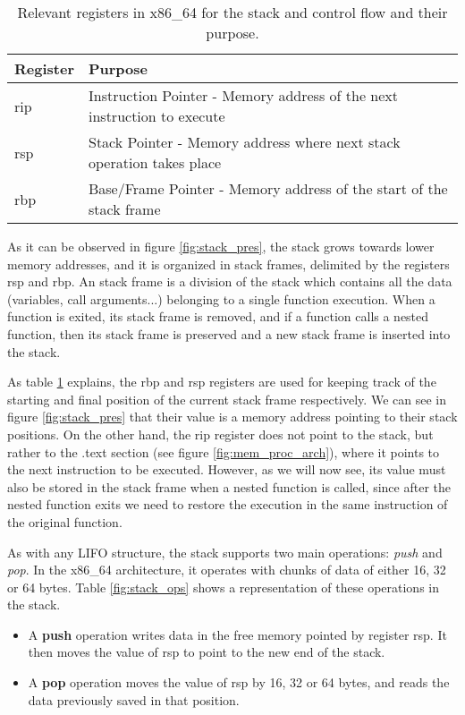 \begin{table}[htbp]
\begin{tabular}{|>{\centering\arraybackslash}p{2cm}|>{\centering\arraybackslash}p{10cm}|}
\hline
Register & Purpose\\
\hline
\hline
rip & Instruction Pointer - Memory address of the next instruction to execute\\
\hline
rsp & Stack Pointer - Memory address where next stack operation takes place\\
\hline
rbp & Base/Frame Pointer - Memory address of the start of the stack frame\\
\hline
\end{tabular}
\caption{Relevant registers in x86\_64 for the stack and control flow and their purpose.}
\label{table:systemv_abi_other}
\end{table}

As it can be observed in figure \ref{fig:stack_pres}, the stack grows towards lower memory addresses, and it is organized in stack frames, delimited by the registers rsp and rbp. An stack frame is a division of the stack which contains all the data (variables, call arguments...) belonging to a single function execution. When a function is exited, its stack frame is removed, and if a function calls a nested function, then its stack frame is preserved and a new stack frame is inserted into the stack. 

As table \ref{table:systemv_abi_other} explains, the rbp and rsp registers are used for keeping track of the starting and final position of the current stack frame respectively. We can see in figure \ref{fig:stack_pres} that their value is a memory address pointing to their stack positions. On the other hand, the rip register does not point to the stack, but rather to the .text section (see figure \ref{fig:mem_proc_arch}), where it points to the next instruction to be executed. However, as we will now see, its value must also be stored in the stack frame when a nested function is called, since after the nested function exits we need to restore the execution in the same instruction of the original function.

As with any LIFO structure, the stack supports two main operations: \textit{push} and \textit{pop}. In the x86\_64 architecture, it operates with chunks of data of either 16, 32 or 64 bytes. Table \ref{fig:stack_ops} shows a representation of these operations in the stack.
\begin{itemize}
\item A \textbf{push} operation writes data in the free memory pointed by register rsp. It then moves the value of rsp to point to the new end of the stack.
\item A \textbf{pop} operation moves the value of rsp by 16, 32 or 64 bytes, and reads the data previously saved in that position.
\end{itemize}

